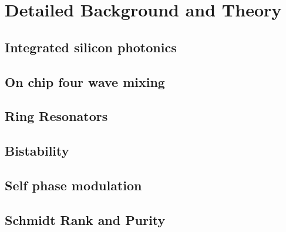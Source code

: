 \section{Detailed Background and Theory}
\subsection{Integrated silicon photonics}
\subsection{On chip four wave mixing}
\subsection{Ring Resonators}
\subsection{Bistability}
\subsection{Self phase modulation}
\subsection{Schmidt Rank and Purity}